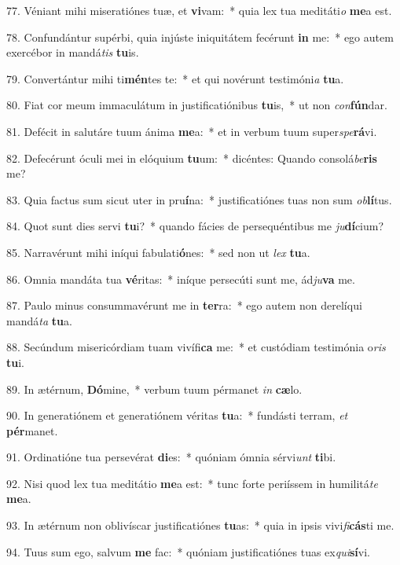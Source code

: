 77. Véniant mihi miseratiónes tuæ, et \textbf{vi}vam:~*  quia lex tua meditáti\textit{o} \textbf{me}a est.\

78. Confundántur supérbi, quia injúste iniquitátem fecérunt \textbf{in} me:~*  ego autem exercébor in mandá\textit{tis} \textbf{tu}is.\

79. Convertántur mihi ti\textbf{mén}tes te:~*  et qui novérunt testimóni\textit{a} \textbf{tu}a.\

80. Fiat cor meum immaculátum in justificatiónibus \textbf{tu}is,~*  ut non \textit{con}\textbf{fún}dar.\

81. Defécit in salutáre tuum ánima \textbf{me}a:~*  et in verbum tuum super\textit{spe}\textbf{rá}vi.\

82. Defecérunt óculi mei in elóquium \textbf{tu}um:~*  dicéntes: Quando consolá\textit{be}\textbf{ris} me?\

83. Quia factus sum sicut uter in pru\textbf{í}na:~*  justificatiónes tuas non sum \textit{ob}\textbf{lí}tus.\

84. Quot sunt dies servi \textbf{tu}i?~*  quando fácies de persequéntibus me \textit{ju}\textbf{dí}cium?\

85. Narravérunt mihi iníqui fabulati\textbf{ó}nes:~*  sed non ut \textit{lex} \textbf{tu}a.\

86. Omnia mandáta tua \textbf{vé}ritas:~*  iníque persecúti sunt me, ád\textit{ju}\textbf{va} me.\

87. Paulo minus consummavérunt me in \textbf{ter}ra:~*  ego autem non derelíqui mandá\textit{ta} \textbf{tu}a.\

88. Secúndum misericórdiam tuam vivífi\textbf{ca} me:~*  et custódiam testimónia o\textit{ris} \textbf{tu}i.\

89. In ætérnum, \textbf{Dó}mine,~*  verbum tuum pérmanet \textit{in} \textbf{cæ}lo.\

90. In generatiónem et generatiónem véritas \textbf{tu}a:~*  fundásti terram, \textit{et} \textbf{pér}manet.\

91. Ordinatióne tua persevérat \textbf{di}es:~*  quóniam ómnia sérvi\textit{unt} \textbf{ti}bi.\

92. Nisi quod lex tua meditátio \textbf{me}a est:~*  tunc forte periíssem in humilitá\textit{te} \textbf{me}a.\

93. In ætérnum non oblivíscar justificatiónes \textbf{tu}as:~*  quia in ipsis vivi\textit{fi}\textbf{cás}ti me.\

94. Tuus sum ego, salvum \textbf{me} fac:~*  quóniam justificatiónes tuas ex\textit{qui}\textbf{sí}vi.\

